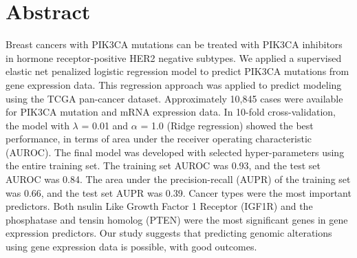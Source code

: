 \documentclass[10pt,letterpaper]{article}
\newcommand{\getIndex}[2]{
  \ForEach{,}{\IfEq{#1}{\thislevelitem}{\number\thislevelcount\ExitForEach}{}}{#2}
}
\newcommand{\getAff}[1]{
  \getIndex{#1}{Department of Hospital Pathology, Seoul St.~Mary's Hospital}
}
\begin{document}
\vspace*{0.2in}

\section*{Abstract}
Breast cancers with PIK3CA mutations can be treated with PIK3CA
inhibitors in hormone receptor-positive HER2 negative subtypes. We
applied a supervised elastic net penalized logistic regression model to
predict PIK3CA mutations from gene expression data. This regression
approach was applied to predict modeling using the TCGA pan-cancer
dataset. Approximately 10,845 cases were available for PIK3CA mutation
and mRNA expression data. In 10-fold cross-validation, the model with
\(\lambda\) = 0.01 and \(\alpha\) = 1.0 (Ridge regression) showed the
best performance, in terms of area under the receiver operating
characteristic (AUROC). The final model was developed with selected
hyper-parameters using the entire training set. The training set AUROC
was 0.93, and the test set AUROC was 0.84. The area under the
precision-recall (AUPR) of the training set was 0.66, and the test set
AUPR was 0.39. Cancer types were the most important predictors. Both
nsulin Like Growth Factor 1 Receptor (IGF1R) and the phosphatase and
tensin homolog (PTEN) were the most significant genes in gene expression
predictors. Our study suggests that predicting genomic alterations using
gene expression data is possible, with good outcomes.
\end{document}
